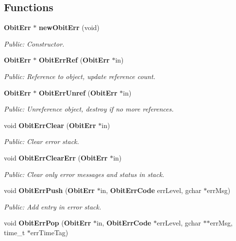 \subsection*{Functions}
\begin{CompactItemize}
\item 
{\bf Obit\-Err} $\ast$ {\bf new\-Obit\-Err} (void)
\begin{CompactList}\small\item\em Public: Constructor. \item\end{CompactList}\item 
{\bf Obit\-Err} $\ast$ {\bf Obit\-Err\-Ref} ({\bf Obit\-Err} $\ast$in)
\begin{CompactList}\small\item\em Public: Reference to object, update reference count. \item\end{CompactList}\item 
{\bf Obit\-Err} $\ast$ {\bf Obit\-Err\-Unref} ({\bf Obit\-Err} $\ast$in)
\begin{CompactList}\small\item\em Public: Unreference object, destroy if no more references. \item\end{CompactList}\item 
void {\bf Obit\-Err\-Clear} ({\bf Obit\-Err} $\ast$in)
\begin{CompactList}\small\item\em Public: Clear error stack. \item\end{CompactList}\item 
void {\bf Obit\-Err\-Clear\-Err} ({\bf Obit\-Err} $\ast$in)
\begin{CompactList}\small\item\em Public: Clear only error messages and status in stack. \item\end{CompactList}\item 
void {\bf Obit\-Err\-Push} ({\bf Obit\-Err} $\ast$in, {\bf Obit\-Err\-Code} err\-Level, gchar $\ast$err\-Msg)
\begin{CompactList}\small\item\em Public: Add entry in error stack. \item\end{CompactList}\item 
void {\bf Obit\-Err\-Pop} ({\bf Obit\-Err} $\ast$in, {\bf Obit\-Err\-Code} $\ast$err\-Level, gchar $\ast$$\ast$err\-Msg, time\_\-t $\ast$err\-Time\-Tag)
$$
\end{CompactItemize}
